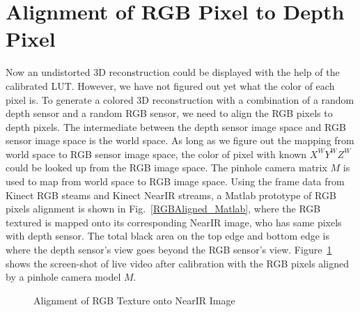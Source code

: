 \section{Alignment of RGB Pixel to Depth Pixel}
Now an undistorted \gls{3D} reconstruction could be displayed with the help of the calibrated \gls{LUT}. However, we have not figured out yet what the color of each pixel is. To generate a colored \gls{3D} reconstruction with a combination of a random depth sensor and a random RGB sensor, we need to align the RGB pixels to depth pixels. The intermediate between the depth sensor image space and RGB sensor image space is the world space. As long as we figure out the mapping from world space to RGB sensor image space, the color of pixel with known \(X^WY^WZ^W\) could be looked up from the RGB image space. The pinhole camera matrix \(M\) is used to map from world space to RGB image space. Using the frame data from Kinect RGB steams and Kinect \gls{NearIR} streams, a Matlab prototype of RGB pixels alignment is shown in Fig.~\ref{RGBAligned_Matlab}, where the RGB textured is mapped onto its corresponding \gls{NearIR} image, who has same pixels with depth sensor. The total black area on the top edge and bottom edge is where the depth sensor's view goes beyond the RGB sensor's view. Figure~\ref{RGBvaluesAligmentMatlabQt} shows the screen-shot of live video after calibration with the RGB pixels aligned by a pinhole camera model \(M\).

%
 \begin{figure}[h]
\hspace*{-0.5cm}
\centering
{}
\caption{Alignment of RGB Texture onto \gls{NearIR} Image}
\label{RGBvaluesAligmentMatlabQt}
\end{figure}%
%


